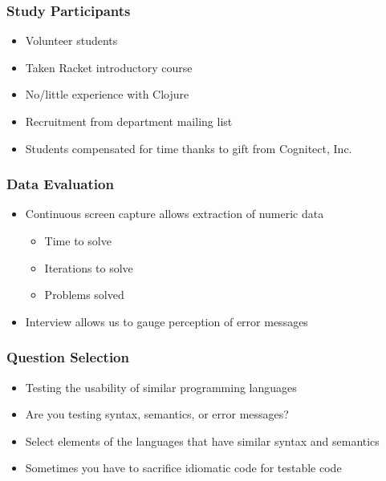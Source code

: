 \documentclass{beamer}
\begin{document}
\begin{frame}
\frametitle{Study Participants}
	\begin{itemize}
		\item Volunteer students
		\item Taken Racket introductory course
		\item No/little experience with Clojure
		\item Recruitment from department mailing list
		\item Students compensated for time thanks to gift from Cognitect, Inc.
	\end{itemize}
\end{frame}

\begin{frame}
\frametitle{Data Evaluation}
	\begin{itemize}
		\item Continuous screen capture allows extraction of numeric data
			\begin{itemize}
				\item Time to solve
				\item Iterations to solve
				\item Problems solved
			\end{itemize}
		\item Interview allows us to gauge perception of error messages
	\end{itemize}
\end{frame}


\begin{frame}
\frametitle{Question Selection}
	\begin{itemize}
		\item Testing the usability of similar programming languages
		\item Are you testing syntax, semantics, or error messages?
		\item Select elements of the languages that have similar syntax and semantics
		\item Sometimes you have to sacrifice idiomatic code for testable code
	\end{itemize}
\end{frame}
\end{document}

